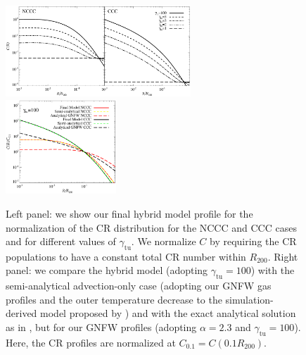 \documentclass[traditabstract]{aa}
\newcommand{\rmn}{\mathrm}
\begin{document}
\begin{figure}[t]
\centering
\includegraphics[width=0.62\textwidth]{figures/CR_profiles_FinalModel.eps}
\includegraphics[width=0.37\textwidth]{figures/CR_profiles_FinalModelvsREX_norm0.1.eps}
\caption{Left panel: we show our final hybrid model profile for the normalization of
  the CR distribution for the NCCC and CCC cases and for
  different values of $\gamma_{\rmn{tu}}$. We normalize $C$ by
  requiring the CR populations to have a constant total CR number within
  $R_{200}$. Right panel: we compare the hybrid model (adopting $\gamma_{\rmn{tu}}=100$) with the semi-analytical
  advection-only case (adopting our GNFW gas profiles and the outer temperature
  decrease to the simulation-derived model proposed by
  \citealp{2010MNRAS.409..449P}) and with the exact analytical solution as in
  \citet{2011A&A...527A..99E}, but for our GNFW profiles (adopting $\alpha=2.3$
  and $\gamma_{\rmn{tu}}=100$). Here, the CR profiles are normalized at
  $C_{0.1}=C(0.1R_{200})$.}
\label{fig:CRFinalModel}
\end{figure}
\end{document}
